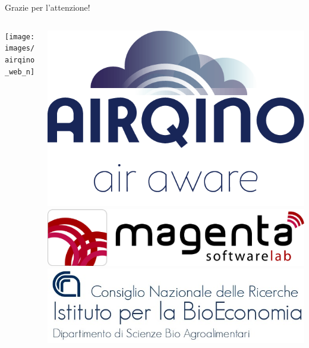 \begin{frame}[noframenumbering]{Grazie per l'attenzione!}
\begin{columns}

\begin{column}{0.79\textwidth}
\begin{center}
\texttt{[image: images/airqino\_web\_n]}
\end{center}
\end{column}

\begin{column}{0.25\textwidth}\vspace{-.1cm}
\begin{center}
\includegraphics[width=\textwidth]{images/airqino}\vspace{0.4cm}
\includegraphics[width=\textwidth]{images/magenta}\vspace{0.5cm}
\includegraphics[width=\textwidth]{images/ibe}
\end{center}
\end{column}

\end{columns}

\end{frame}


